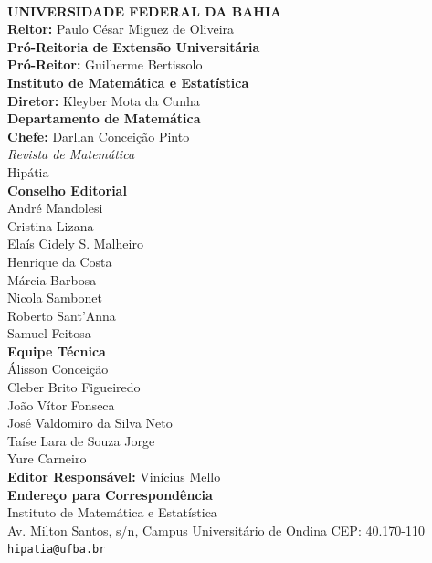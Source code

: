 \documentclass[onecolumn]{hipatia}
\begin{document}
\newpage
~
\newpage
\pagecolor{white}
\begin{center}
  \textbf{UNIVERSIDADE FEDERAL DA BAHIA} \\
  \textbf{Reitor:} Paulo César Miguez de Oliveira\\
\vspace*{0.5cm}
  \textbf{Pró-Reitoria de Extensão Universitária} \\
  \textbf{Pró-Reitor:} Guilherme Bertissolo\\
  \vspace*{0.5cm}  
  \textbf{Instituto de Matemática e Estatística} \\
  \textbf{Diretor:} Kleyber Mota da Cunha\\
  \vspace*{0.5cm}
  \textbf{Departamento de Matemática} \\
  \textbf{Chefe:} Darllan Conceição Pinto\\
\vspace*{2cm}
{\fontsize{23}{23}\selectfont\textit{Revista de Matemática}}\\
\vspace*{0.3cm}
{\fontsize{72}{72}\selectfont Hipátia}\\
\vspace*{0.8cm}
\textbf{Conselho Editorial} \\
André Mandolesi\\
Cristina Lizana\\
Elaís Cidely S. Malheiro\\
Henrique da Costa\\
Márcia Barbosa\\
Nicola Sambonet\\
Roberto Sant'Anna\\
Samuel Feitosa\\
\vspace*{0.2cm}
\textbf{Equipe Técnica} \\
Álisson Conceição\\
Cleber Brito Figueiredo\\
João Vítor Fonseca \\
José Valdomiro da Silva Neto\\
Taíse Lara de Souza Jorge\\
Yure Carneiro\\
\vspace*{0.5cm}
\textbf{Editor Responsável:} Vinícius Mello  \\

\vspace*{0.7cm}
\textbf{Endereço para Correspondência}\\
Instituto de Matemática e Estatística\\
Av. Milton Santos, s/n, Campus Universitário de Ondina CEP: 40.170-110\\
\texttt{hipatia@ufba.br}\\


\end{center}
\end{document}
